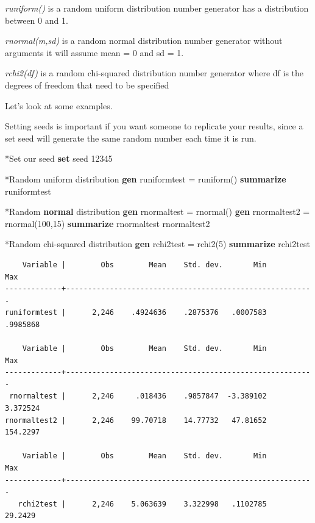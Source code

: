 \documentclass[
]{book}
\newenvironment{Shaded}{\begin{snugshade}}{\end{snugshade}}
\newcommand{\DecValTok}[1]{\textcolor[rgb]{0.00,0.00,0.81}{#1}}
\newcommand{\FunctionTok}[1]{\textcolor[rgb]{0.13,0.29,0.53}{\textbf{#1}}}
\newcommand{\KeywordTok}[1]{\textcolor[rgb]{0.13,0.29,0.53}{\textbf{#1}}}
\newcommand{\NormalTok}[1]{#1}
\begin{document}
\emph{runiform()} is a random uniform distribution number generator has a distribution between 0 and 1.

\emph{rnormal(m,sd)} is a random normal distribution number generator without arguments it will assume mean = 0 and sd = 1.

\emph{rchi2(df)} is a random chi-squared distribution number generator where df is the degrees of freedom that need to be specified

Let's look at some examples.

Setting seeds is important if you want someone to replicate your results, since a set seed will generate the same random number each time it is run.

\begin{Shaded}
\begin{Highlighting}[]
\NormalTok{*Set our }\DecValTok{seed}
\KeywordTok{set} \DecValTok{seed}\NormalTok{ 12345}

\NormalTok{*Random uniform distribution }
\KeywordTok{gen}\NormalTok{ runiformtest = runiform()}
\KeywordTok{summarize}\NormalTok{ runiformtest}

\NormalTok{*Random }\FunctionTok{normal}\NormalTok{ distribution}
\KeywordTok{gen}\NormalTok{ rnormaltest = rnormal()}
\KeywordTok{gen}\NormalTok{ rnormaltest2 = rnormal(100,15)}
\KeywordTok{summarize}\NormalTok{ rnormaltest rnormaltest2}

\NormalTok{*Random chi{-}squared distribution}
\KeywordTok{gen}\NormalTok{ rchi2test = rchi2(5)}
\KeywordTok{summarize}\NormalTok{ rchi2test}
\end{Highlighting}
\end{Shaded}

\begin{verbatim}
    Variable |        Obs        Mean    Std. dev.       Min        Max
-------------+---------------------------------------------------------
runiformtest |      2,246    .4924636    .2875376   .0007583   .9985868

    Variable |        Obs        Mean    Std. dev.       Min        Max
-------------+---------------------------------------------------------
 rnormaltest |      2,246     .018436    .9857847  -3.389102   3.372524
rnormaltest2 |      2,246    99.70718    14.77732   47.81652   154.2297

    Variable |        Obs        Mean    Std. dev.       Min        Max
-------------+---------------------------------------------------------
   rchi2test |      2,246    5.063639    3.322998   .1102785    29.2429
\end{verbatim}
\end{document}
